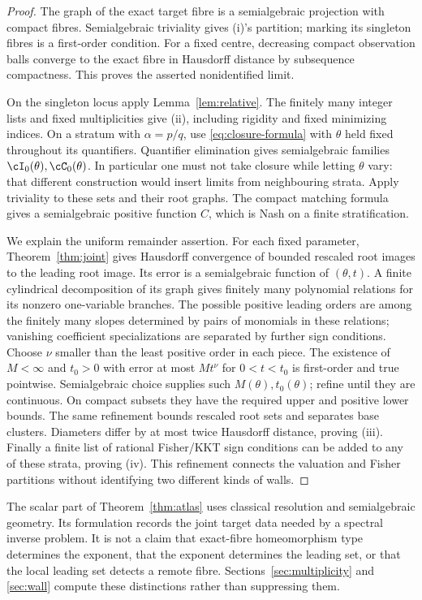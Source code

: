 \begin{proof}
The graph of the exact target fibre is a semialgebraic projection with
compact fibres. Semialgebraic triviality \cite{Hardt80} gives (i)'s
partition; marking its singleton fibres is a first-order condition.
For a fixed centre, decreasing compact observation balls converge to
the exact fibre in Hausdorff distance by subsequence compactness. This
proves the asserted nonidentified limit.

On the singleton locus apply Lemma~\ref{lem:relative}. The finitely many
integer lists and fixed multiplicities give (ii), including rigidity
and fixed minimizing indices. On a stratum with $\alpha=p/q$, use
\eqref{eq:closure-formula} with $\theta$ held fixed throughout its
quantifiers. Quantifier elimination gives semialgebraic families
$\cI_0(\theta),\cC_0(\theta)$. In particular one must not take closure
while letting $\theta$ vary: that different construction would insert
limits from neighbouring strata. Apply triviality to these sets and
their root graphs. The compact matching formula gives a semialgebraic
positive function $C$, which is Nash on a finite stratification.

We explain the uniform remainder assertion. For each fixed parameter,
Theorem~\ref{thm:joint} gives Hausdorff convergence of bounded rescaled
root images to the leading root image. Its error is a semialgebraic
function of $(\theta,t)$. A finite cylindrical decomposition of its
graph gives finitely many polynomial relations for its nonzero
one-variable branches. The possible positive leading orders are among
the finitely many slopes determined by pairs of monomials in these
relations; vanishing coefficient specializations are separated by
further sign conditions. Choose $\nu$ smaller than the least positive
order in each piece. The existence of $M<\infty$ and $t_0>0$ with
error at most $Mt^\nu$ for $0<t<t_0$ is first-order and true pointwise.
Semialgebraic choice supplies such $M(\theta),t_0(\theta)$; refine until
they are continuous. On compact subsets they have the required upper
and positive lower bounds. The same refinement bounds rescaled root
sets and separates base clusters. Diameters differ by at most twice
Hausdorff distance, proving (iii). Finally a finite list of rational
Fisher/KKT sign conditions can be added to any of these strata, proving
(iv). This refinement connects the valuation and Fisher partitions
without identifying two different kinds of walls.
\end{proof}

\begin{remark}
The scalar part of Theorem~\ref{thm:atlas} uses classical resolution and
semialgebraic geometry. Its formulation records the joint target data
needed by a spectral inverse problem. It is not a claim that exact-fibre
homeomorphism type determines the exponent, that the exponent determines
the leading set, or that the local leading set detects a remote fibre.
Sections~\ref{sec:multiplicity} and \ref{sec:wall} compute these distinctions
rather than suppressing them.
\end{remark}
